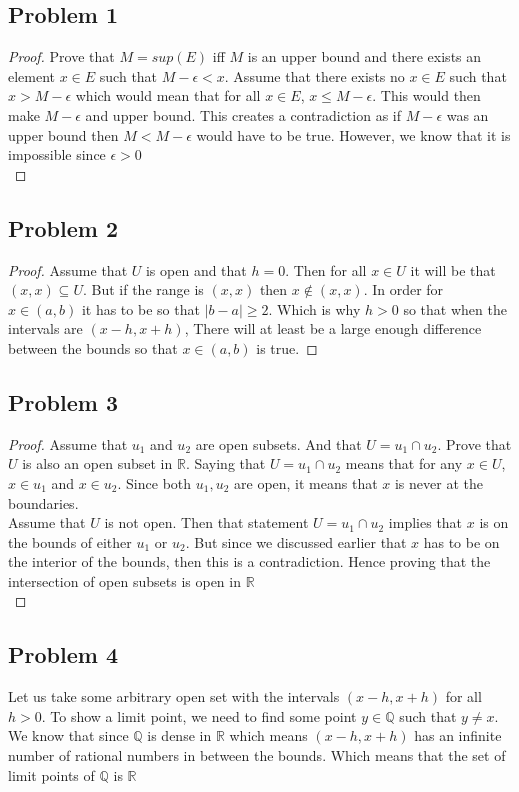 \documentclass[12pt]{article}
\newcommand{\R}{\mathbb{R}}
\newcommand{\Q}{\mathbb{Q}}
\begin{document}
\subsection*{Problem 1}
\begin{proof}
Prove that $M = sup(E)$ iff $M$ is an upper bound and there exists an element $x \in E$ such that $M - \epsilon < x$. Assume that there exists no $x \in E$ such that $x > M - \epsilon$ which would mean that for all $x \in E$, $x \leq M - \epsilon$. This would then make $M - \epsilon$ and upper bound. This creates a contradiction as if $M - \epsilon$ was an upper bound then $M < M - \epsilon$ would have to be true. However, we know that it is impossible since $\epsilon > 0$\\
\end{proof}
\subsection*{Problem 2}
\begin{proof}
Assume that $U$ is open and that $h = 0$. Then for all $x \in U$ it will be that $(x, x) \subseteq U$. But if the range is $(x,x)$ then $x \not \in (x,x)$. In order for $x \in (a,b)$ it has to be so that $|b - a| \geq 2$. Which is why $h > 0$ so that when the intervals are $(x - h, x + h)$, There will at least be a large enough difference between the bounds so that $x \in (a,b)$ is true.
\end{proof}
\subsection*{Problem 3}
\begin{proof}
Assume that $u_1$ and $u_2$ are open subsets. And that $U = u_1 \cap u_2$. Prove that $U$ is also an open subset in $\R$. Saying that $U = u_1 \cap u_2$ means that for any $x \in U$, $x \in u_1$ and $x \in u_2$. Since both $u_1, u_2$ are open, it means that $x$ is never at the boundaries.\\
Assume that $U$ is not open. Then that statement $U = u_1 \cap u_2$ implies that $x$ is on the bounds of either $u_1$ or $u_2$. But since we discussed earlier that $x$ has to be on the interior of the bounds, then this is a contradiction. Hence proving that the intersection of open subsets is open in $\R$\\
\end{proof}
\subsection*{Problem 4}
Let us take some arbitrary open set with the intervals $(x - h, x + h)$ for all $h > 0$. To show a limit point, we need to find some point $y \in \Q$ such that $y \neq x$. We know that since $\Q$ is dense in $\R$ which means $(x - h, x + h)$ has an infinite number of rational numbers in between the bounds. Which means that the set of limit points of $\Q$ is $\R$
\end{document}
